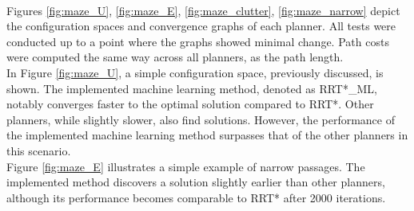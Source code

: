 \documentclass{ctuthesis}
\begin{document}
\\
Figures \ref{fig:maze_U}, \ref{fig:maze_E}, \ref{fig:maze_clutter}, \ref{fig:maze_narrow} 
depict the configuration spaces and convergence graphs of each planner. 
All tests were conducted up to a point where the graphs showed minimal change.
Path costs were computed the same way across all planners, as the path length.
\\[12pt]
In Figure \ref{fig:maze_U}, 
a simple configuration space, previously discussed, is shown. 
The implemented machine learning method, denoted as RRT*\_ML, 
notably converges faster to the optimal solution compared to RRT*. 
Other planners, while slightly slower, also find solutions. 
However, the performance of the implemented machine learning method surpasses 
that of the other planners in this scenario.
\\[12pt]
Figure \ref{fig:maze_E} illustrates a simple example of narrow passages. 
The implemented method discovers a solution slightly earlier than other planners, 
although its performance becomes comparable to RRT* after 2000 iterations.
\end{document}
